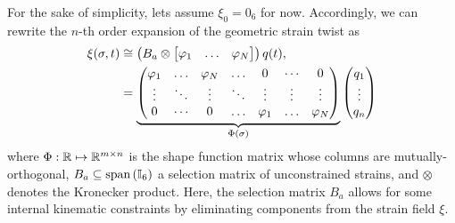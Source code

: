For the sake of simplicity, lets assume $\xi_0 =  0_6$ for now. Accordingly, we can rewrite the $n$-th order expansion of the geometric strain twist as
%
\begin{align}
\xi(\sigma,t) & \cong \left(B_a  \otimes \begin{bmatrix} \varphi_1 & \hdots & \varphi_N \end{bmatrix} \right) q(t), \notag \\
& = \underbrace{\begin{pmatrix} 
\varphi_1 & \hdots & \varphi_N & \hdots & 0 & \cdots&  0 \\ 
\vdots & \ddots & \vdots & \ddots & \vdots & \vdots & \vdots \\ 
0 & \cdots&  0 & \hdots & \varphi_1 & \hdots & \varphi_N\end{pmatrix}}_{{\Phi(\sigma)}}  \begin{pmatrix} q_1 \\ \vdots \\ q_n\end{pmatrix}
\end{align}
%
where $\Phi: \mathbb{R} \mapsto \mathbb{R}^{m \times n}$ is the shape function matrix whose columns are mutually-orthogonal, $B_a \subseteq \textnormal{span}\left( \mathbb{I}_6 \right)$ a selection matrix of unconstrained strains, and $\otimes$ denotes the Kronecker product. Here, the selection matrix $B_a$ allows for some internal kinematic constraints by eliminating components from the strain field $\xi$. 

